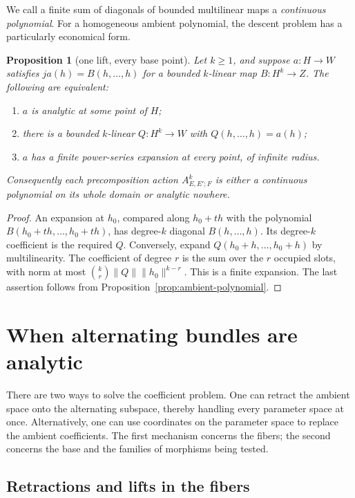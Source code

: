 \documentclass[11pt]{amsart}
\newtheorem{proposition}[theorem]{Proposition}
\theoremstyle{definition}
\theoremstyle{remark}
\numberwithin{equation}{section}
\newcommand{\norm}[1]{\lVert #1\rVert}
\begin{document}
We call a finite sum of diagonals of bounded multilinear maps a \emph{continuous polynomial}.
For a homogeneous ambient polynomial, the descent problem has a particularly economical form.
\begin{proposition}[one lift, every base point]\label{prop:homogeneous-lift}
Let $k\ge1$, and suppose $a\colon H\to W$ satisfies
$ja(h)=B(h,\ldots,h)$ for a bounded $k$-linear map $B\colon H^k\to Z$. The following are equivalent:
\begin{enumerate}
\item $a$ is analytic at some point of $H$;
\item there is a bounded $k$-linear $Q\colon H^k\to W$ with $Q(h,\ldots,h)=a(h)$;
\item $a$ has a finite power-series expansion at every point, of infinite radius.
\end{enumerate}
Consequently each precomposition action $A^k_{E,E';F}$ is either a continuous polynomial on its whole domain or analytic nowhere.
\end{proposition}
\begin{proof}
An expansion at $h_0$, compared along $h_0+th$ with the polynomial $B(h_0+th,\ldots,h_0+th)$, has degree-$k$ diagonal $B(h,\ldots,h)$. Its degree-$k$ coefficient is the required $Q$. Conversely, expand $Q(h_0+h,\ldots,h_0+h)$ by multilinearity. The coefficient of degree $r$ is the sum over the $r$ occupied slots, with norm at most
$\binom kr\norm Q\norm{h_0}^{k-r}$. This is a finite expansion. The last assertion follows from Proposition~\ref{prop:ambient-polynomial}.
\end{proof}

\section{When alternating bundles are analytic}\label{sec:positive}

There are two ways to solve the coefficient problem. One can retract the ambient space onto the alternating subspace, thereby handling every parameter space at once. Alternatively, one can use coordinates on the parameter space to replace the ambient coefficients. The first mechanism concerns the fibers; the second concerns the base and the families of morphisms being tested.

\subsection{Retractions and lifts in the fibers}
\end{document}
